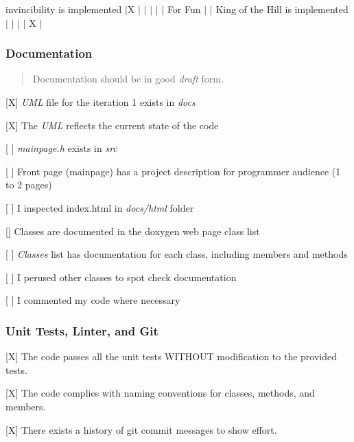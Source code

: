 invincibility is implemented $\vert$X $\vert$ $\vert$ $\vert$ $\vert$ $\vert$ For Fun $\vert$ $\vert$ King of the Hill is implemented $\vert$ $\vert$ $\vert$ $\vert$ X $\vert$

\subsubsection*{Documentation}

\begin{quote}
Documentation should be in good {\itshape draft} form. \end{quote}



\begin{DoxyItemize}
\item \mbox{[}X\mbox{]} {\itshape U\+ML} file for the iteration 1 exists in {\itshape docs}
\item \mbox{[}X\mbox{]} The {\itshape U\+ML} reflects the current state of the code
\item \mbox{[} \mbox{]} {\itshape mainpage.\+h} exists in {\itshape src}
\item \mbox{[} \mbox{]} Front page (mainpage) has a project description for programmer audience (1 to 2 pages)
\item \mbox{[} \mbox{]} I inspected index.\+html in {\itshape docs/html} folder
\item \mbox{[}\mbox{]} Classes are documented in the doxygen web page class list
\item \mbox{[} \mbox{]} {\itshape Classes} list has documentation for each class, including members and methods
\item \mbox{[} \mbox{]} I perused other classes to spot check documentation
\item \mbox{[} \mbox{]} I commented my code where necessary
\end{DoxyItemize}

\subsubsection*{Unit Tests, Linter, and Git}


\begin{DoxyItemize}
\item \mbox{[}X\mbox{]} The code passes all the unit tests W\+I\+T\+H\+O\+UT modification to the provided tests.
\item \mbox{[}X\mbox{]} The code complies with naming conventions for classes, methods, and members.
\item \mbox{[}X\mbox{]} There exists a history of git commit messages to show effort.
\end{DoxyItemize}

